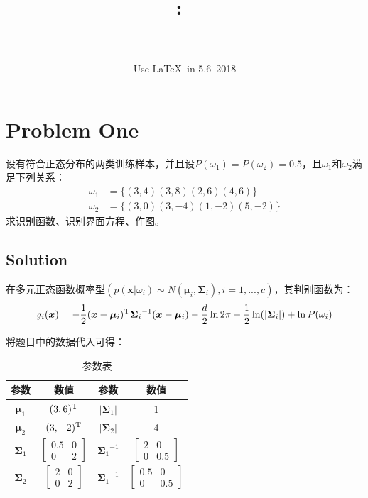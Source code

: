 \documentclass{article}
\title{
    \vspace{2in}
    \textmd{\textbf{\hmwkClass:\ \hmwkTitle}}\\
    \vspace{0.5cm}\LARGE{\textit{\hmwkClassInstructor}}
    \vspace{4in}
}
\author{\hmwkAuthorName\\
{\schoolID}\\
Use \LaTeX ~in 5.6~2018}
\date{}
\newcommand{\hs}{\hspace{2em}}
\begin{document}
\maketitle
\setcounter{page}{0}
\thispagestyle{empty}
\pagebreak

\section{Problem One}
{}


\hs 设有符合正态分布的两类训练样本，并且设$P(\omega_1)=P(\omega_2)=0.5$，且$\omega_1$和$\omega_2$满足下列关系：
\begin{equation*}
\begin{split}
\omega_1&=\{(3,4)(3,8)(2,6)(4,6)\}\\
\omega_2&=\{(3,0)(3,-4)(1,-2)(5,-2)\}	
\end{split}
\end{equation*}
求识别函数、识别界面方程、作图。

\subsection{Solution}
{}
\hs 在多元正态函数概率型$(p({\bm x}|\omega_i)\sim N({\bm \mu}_i,\bm{\Sigma}_i),i=1,...,c)$，其判别函数为：
\begin{equation*}
g_i({\bm x}) = -\frac{1}{2}({\bm x}-{\bm \mu}_i)^{\rm T}{\bm{\Sigma}_i}^{-1}({\bm x}-{\bm \mu}_i)-\frac{d}{2}\ln2\pi -\frac{1}{2}\ln(|\bm{\Sigma}_i|)+\ln P(\omega_i)
\end{equation*}

\hs 将题目中的数据代入可得：

\begin{table}[htbp]
	\centering
	\begin{tabular}{cccc}
		\hline 
		参数 &  数值 & 参数 & 数值 \\
		\hline 
		${\bm \mu}_1$ &  $(3,6)^{\rm T}$ & $|\bm{\Sigma}_1|$   & 1   \\
		${\bm \mu}_2$ &  $(3,-2)^{\rm T}$ & $|\bm{\Sigma}_2|$   & 4 \\
		${\bm{\Sigma}_1}$ & $\left[ \begin{array}{cc}
		0.5 & 0 \\
		0& 2
		\end{array}\right]$ & ${\bm{\Sigma}_1}^{-1}$ & $\left[ \begin{array}{cc}
		2 & 0 \\
		0& 0.5
		\end{array}\right]$ \\
		${\bm{\Sigma}_2}$ & $\left[ \begin{array}{cc}
		2 & 0 \\
		0& 2
		\end{array}\right]$ & ${\bm{\Sigma}_1}^{-1}$ & $\left[ \begin{array}{cc}
		0.5 & 0 \\
		0& 0.5
		\end{array}\right]$ \\
		\hline
	\end{tabular}
\caption{参数表}
\end{table}
\end{document}
